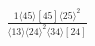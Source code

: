 \documentclass[varwidth, border=5pt]{standalone}
\begin{document}
\begin{my}
$\begin{gathered}
\scriptscriptstyle\frac{1⟨45⟩[45]⟨25⟩^2}{⟨13⟩⟨24⟩^2⟨34⟩[24]}
\end{gathered}$
\end{my}
\end{document}
